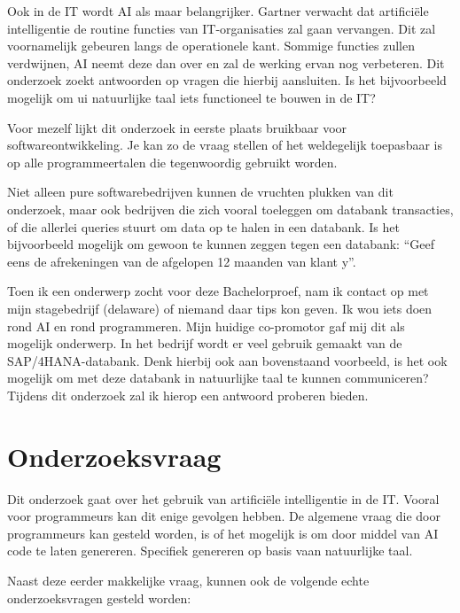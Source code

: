 Ook in de IT wordt AI als maar belangrijker. Gartner verwacht dat artificiële intelligentie de routine functies van IT-organisaties zal gaan vervangen. Dit zal voornamelijk  gebeuren langs de operationele kant. Sommige functies zullen verdwijnen, AI neemt deze dan over en zal de werking ervan nog verbeteren. Dit onderzoek zoekt antwoorden op vragen die hierbij aansluiten. Is het bijvoorbeeld mogelijk om ui natuurlijke taal iets functioneel te bouwen in de IT? 

Voor mezelf lijkt dit onderzoek in eerste plaats bruikbaar voor softwareontwikkeling. Je kan zo de vraag stellen of het weldegelijk toepasbaar is op alle programmeertalen die tegenwoordig gebruikt worden. 

Niet alleen pure softwarebedrijven kunnen de vruchten plukken van dit onderzoek, maar ook bedrijven die zich vooral toeleggen om databank transacties, of die allerlei queries stuurt om data op te halen in een databank. Is het bijvoorbeeld mogelijk om gewoon te kunnen zeggen tegen een databank: “Geef eens de afrekeningen van de afgelopen 12 maanden van klant y”. 

Toen ik een onderwerp zocht voor deze Bachelorproef, nam ik contact op met mijn stagebedrijf (delaware) of niemand daar tips kon geven. Ik wou iets doen rond AI en rond programmeren. Mijn huidige co-promotor gaf mij dit als mogelijk onderwerp. In het bedrijf wordt er veel gebruik gemaakt van de SAP/4HANA-databank. Denk hierbij ook aan bovenstaand voorbeeld, is het ook mogelijk om met deze databank in natuurlijke taal te kunnen communiceren? Tijdens dit onderzoek zal ik hierop een antwoord proberen bieden.

\section{Onderzoeksvraag}
\label{sec:onderzoeksvraag}

Dit onderzoek gaat over het gebruik van artificiële intelligentie in de IT. Vooral voor programmeurs kan dit enige gevolgen hebben. De algemene vraag die door programmeurs kan gesteld worden, is of het mogelijk is om door middel van AI code te laten genereren. Specifiek genereren op basis vaan natuurlijke taal. 

Naast deze eerder makkelijke vraag, kunnen ook de volgende echte onderzoeksvragen gesteld worden:

